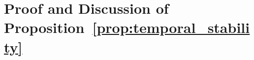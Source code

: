 \documentclass[a4paper,fleqn]{cas-sc}
\begin{document}






\printcredits

%






\newpage
\appendix


\section{Proof and Discussion of Proposition~\ref{prop:temporal_stability}}
\label{app:temporal_stability_proof}
\end{document}
